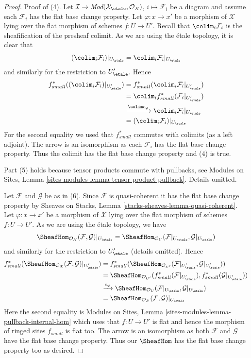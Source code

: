 \begin{proof}
\medskip\noindent
Proof of (4). Let $\mathcal{I} \to
\textit{Mod}(\mathcal{X}_\etale, \mathcal{O}_\mathcal{X})$,
$i \mapsto \mathcal{F}_i$ be a diagram and assume each $\mathcal{F}_i$
has the flat base change property. Let $\varphi : x \to x'$ be a morphism
of $\mathcal{X}$ lying over the flat morphism of schemes $f : U \to U'$.
Recall that $\colim_i \mathcal{F}_i$ is the sheafification of the presheaf
colimit. As we are using the \'etale topology, it is clear that
$$
(\colim_i \mathcal{F}_i)|_{U_\etale} =
\colim_i {\mathcal{F}_i}|_{U_\etale}
$$
and similarly for the restriction to $U'_\etale$. Hence
\begin{align*}
f_{small}^*((\colim_i \mathcal{F}_i)|_{U'_\etale})
& =
f_{small}^*(\colim_i {\mathcal{F}_i}|_{U'_\etale}) \\
& =
\colim_i f_{small}^*({\mathcal{F}_i}|_{U'_\etale}) \\
& \xrightarrow{\colim c_\varphi}
\colim_i \mathcal{F}_i|_{U_\etale} \\
& =
(\colim_i \mathcal{F}_i)|_{U_\etale}
\end{align*}
For the second equality we used that $f_{small}^*$ commutes with colimits
(as a left adjoint). The arrow is an isomorphism as each
$\mathcal{F}_i$ has the flat base change property. Thus the colimit
has the flat base change property and (4) is true.

\medskip\noindent
Part (5) holds because tensor products commute with pullbacks, see
Modules on Sites, Lemma \ref{sites-modules-lemma-tensor-product-pullback}.
Details omitted.

\medskip\noindent
Let $\mathcal{F}$ and $\mathcal{G}$ be as in (6). Since $\mathcal{F}$
is quasi-coherent it has the flat base change property by
Sheaves on Stacks, Lemma \ref{stacks-sheaves-lemma-quasi-coherent}.
Let $\varphi : x \to x'$ be a morphism of $\mathcal{X}$ lying
over the flat morphism of schemes $f : U \to U'$.
As we are using the \'etale topology, we have
$$
\SheafHom_{\mathcal{O}_\mathcal{X}}(\mathcal{F}, \mathcal{G})|_{U_\etale} =
\SheafHom_{\mathcal{O}_U}(\mathcal{F}|_{U_\etale}, \mathcal{G}|_{U_\etale})
$$
and similarly for the restriction to $U'_\etale$ (details omitted). Hence
\begin{align*}
f_{small}^*(
\SheafHom_{\mathcal{O}_\mathcal{X}}(\mathcal{F}, \mathcal{G})|_{U'_\etale})
& =
f_{small}^*(
\SheafHom_{\mathcal{O}_{U'}}(
\mathcal{F}|_{U'_\etale}, \mathcal{G}|_{U'_\etale})) \\
& =
\SheafHom_{\mathcal{O}_{U'}}(
f_{small}^*(\mathcal{F}|_{U'_\etale}),
f_{small}^*(\mathcal{G}|_{U'_\etale})) \\
& \xrightarrow{c_\varphi}
\SheafHom_{\mathcal{O}_U}(\mathcal{F}|_{U_\etale}, \mathcal{G}|_{U_\etale}) \\
& =
\SheafHom_{\mathcal{O}_\mathcal{X}}(\mathcal{F}, \mathcal{G})|_{U_\etale}
\end{align*}
Here the second equality is
Modules on Sites, Lemma \ref{sites-modules-lemma-pullback-internal-hom}
which uses that $f : U \to U'$ is flat and hence the morphism
of ringed sites $f_{small}$ is flat too.
The arrow is an isomorphism as both $\mathcal{F}$ and $\mathcal{G}$
have the flat base change property. Thus our $\SheafHom$
has the flat base change property too as desired.
\end{proof}
